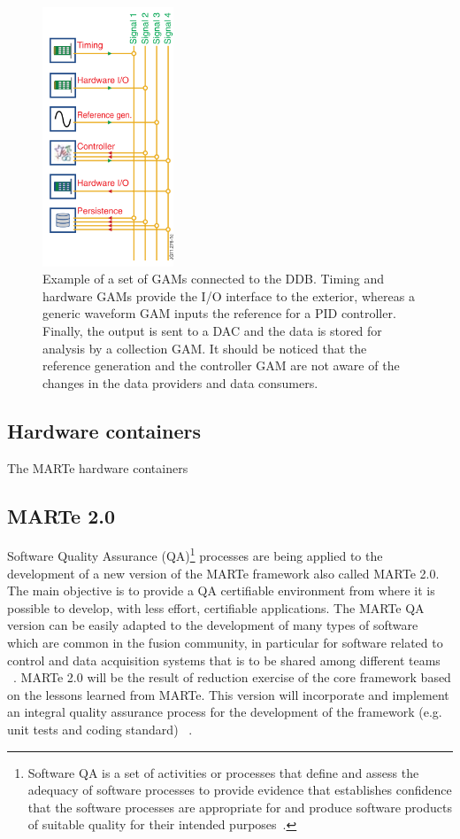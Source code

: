 \begin{figure}[htbp]
	\centering
	\includegraphics[width=0.35\textwidth]{Chp2/GAMs.png}
	\caption{\label{GAMs} Example of a set of GAMs connected to the DDB. Timing and hardware GAMs provide the I/O interface to the exterior, whereas a generic waveform GAM inputs the reference for a PID controller. Finally, the output is sent to a DAC and the data is stored for analysis by a collection GAM.  It should be noticed that the reference generation and the controller GAM are not aware of the changes in the data providers and data consumers.  \cite{MARTe2011}}
	
\end{figure}

\subsection{Hardware containers}

The MARTe hardware containers 


\subsection{MARTe 2.0}
Software Quality Assurance (QA)\footnote{Software QA is a set of activities or processes that define and assess the adequacy of software processes to provide evidence that establishes confidence that the software processes are appropriate for and produce software products of suitable quality for their intended purposes~\cite[Chapter 5.1]{SQA}.} processes are being applied to the development of a new version of the MARTe framework also  called MARTe 2.0. The  main objective is to provide a QA certifiable environment from where it is possible to develop, with less effort, certifiable applications. The  MARTe QA version can be easily adapted to the development of many types of software which are common in the fusion community, in particular for software related to control and data acquisition systems that is to be shared among different teams  ~\cite{MARTe2}. MARTe 2.0 will be the result of reduction exercise of the core framework based on the lessons learned from MARTe. This version will incorporate and implement an integral quality assurance process for the development of the framework (e.g. unit tests and coding standard) ~\cite{MARTe2PMP}. 
\smallskip

